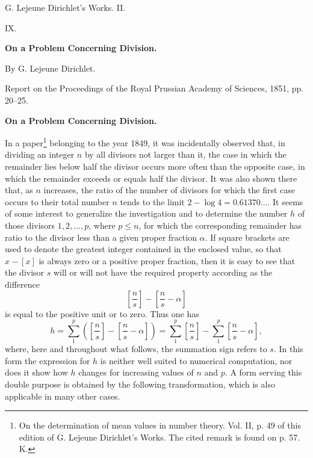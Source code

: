 \documentclass[11pt]{article}
\newcommand{\floor}[1]{\left[#1\right]}
\begin{document}
\begin{center}
{\Large G. Lejeune Dirichlet's Works. II.}\par\vspace{1.2em}
{\Large IX.}\par\vspace{0.5em}
{\LARGE \textbf{On a Problem Concerning Division.}}\par\vspace{1em}
{\large By G. Lejeune Dirichlet.}\par\vspace{0.5em}
{\small Report on the Proceedings of the Royal Prussian Academy of Sciences, 1851, pp. 20--25.}
\end{center}

\begin{center}
{\large \textbf{On a Problem Concerning Division.}}
\end{center}


In a paper\footnote{On the determination of mean values in number theory. Vol. II, p. 49 of this edition of G. Lejeune Dirichlet's Works. The cited remark is found on p. 57. K.} belonging to the year 1849, it was incidentally observed that, in dividing an integer $n$ by all divisors not larger than it, the case in which the remainder lies below half the divisor occurs more often than the opposite case, in which the remainder exceeds or equals half the divisor. It was also shown there that, as $n$ increases, the ratio of the number of divisors for which the first case occurs to their total number $n$ tends to the limit $2-\log 4=0.61370\ldots$. It seems of some interest to generalize the investigation and to determine the number $h$ of those divisors $1,2,\ldots,p$, where $p\leq n$, for which the corresponding remainder has ratio to the divisor less than a given proper fraction $\alpha$. If square brackets are used to denote the greatest integer contained in the enclosed value, so that $x-\floor{x}$ is always zero or a positive proper fraction, then it is easy to see that the divisor $s$ will or will not have the required property according as the difference
\[
 \floor{\frac ns}-\floor{\frac ns-\alpha}
\]
is equal to the positive unit or to zero. Thus one has
\[
 h=\sum_{1}^{p}\left(\floor{\frac ns}-\floor{\frac ns-\alpha}\right)
  =\sum_{1}^{p}\floor{\frac ns}-\sum_{1}^{p}\floor{\frac ns-\alpha},
\]
where, here and throughout what follows, the summation sign refers to $s$. In this form the expression for $h$ is neither well suited to numerical computation, nor does it show how $h$ changes for increasing values of $n$ and $p$. A form serving this double purpose is obtained by the following transformation, which is also applicable in many other cases.
\end{document}
